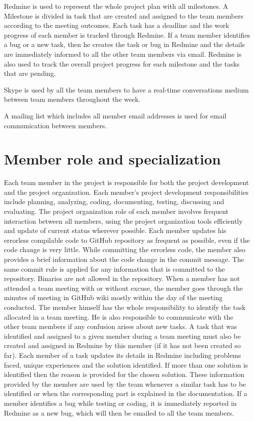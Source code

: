 Redmine is used to represent the whole project plan with all milestones.
A Milestone is divided in task that are created and assigned to the team members according to the meeting outcomes.
Each task has a deadline and the work progress of each member is tracked through Redmine.
If a team member identifies a bug or a new task, then he creates the task or bug in Redmine and the details are immediately informed to all the other team members via email.
Redmine is also used to track the overall project progress for each milestone and the tasks that are pending.

Skype is used by all the team members to have a real-time conversations medium between team members throughout the week.

A mailing list which includes all member email addresses is used for email communication between members.

\section{Member role and specialization}

Each team member in the project is responsible for both the project development and the project organization.
Each member's project development responsibilities include planning, analyzing, coding, documenting, testing, discussing and evaluating.
The project organization role of each member involves frequent interaction between all members, using
the project organization tools efficiently and update of current status wherever possible.
Each member updates his errorless compilable code to GitHub repository as frequent as possible, even if the code change is very little.
While committing the errorless code, the member also provides a brief information about the code change in the commit message.
The same commit rule is applied for any information that is committed to the repository.
Binaries are not allowed in the repository.
When a member has not attended a team meeting with or without excuse, the member
goes through the minutes of meeting in GitHub wiki mostly within the day of the meeting conducted.
The member himself has the whole responsibility to identify the task allocated in a team meeting.
He is also responsible to communicate with the other team members if any confusion arises about new tasks.
A task that was identified and assigned to a given member during a team meeting must also be created and assigned in Redmine by this member (if it has not been created so far).
Each member of a task updates its details in Redmine including problems faced, unique experiences and the solution identified.
If more than one solution is identified then the reason is provided for the chosen solution.
These information provided by the member are used by the team whenever a similar task has to be identified or when the corresponding part is explained in the documentation.
If a member identifies a bug while testing or coding, it is immediately reported in Redmine as a new bug, which will then be emailed to all the team members.

